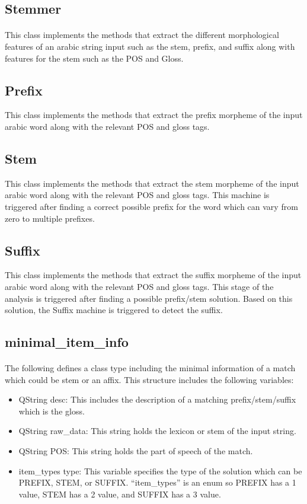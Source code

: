 \documentclass{article}
\begin{document}
\subsection{Stemmer}
\paragraph{}
This class implements the methods that extract the different morphological features of an arabic string input such as the stem, prefix, and suffix along with features for the stem such as the POS and Gloss.

\subsection{Prefix}
This class implements the methods that extract the prefix morpheme of the input arabic word along with the relevant POS and gloss tags.


\subsection{Stem}
This class implements the methods that extract the stem morpheme of the input arabic word along with the relevant POS and gloss tags. This machine is triggered after finding a correct possible prefix for the word which can vary from zero to multiple prefixes.

\subsection{Suffix}
This class implements the methods that extract the suffix morpheme of the input arabic word along with the relevant POS and gloss tags. This stage of the analysis is triggered after finding a possible prefix/stem solution. Based on this solution, the Suffix machine is triggered to detect the suffix.

\subsection{minimal\_item\_info}
\paragraph{}
The following defines a class type including the minimal information of a match which could be stem or an affix. This structure includes the following variables:
\begin{itemize}
\item QString desc: This includes the description of a matching prefix/stem/suffix which is the gloss.
\item QString raw\_data: This string holds the lexicon or stem of the input string.
\item QString POS: This string holds the part of speech of the match.
\item item\_types type: This variable specifies the type of the solution which can be PREFIX, STEM, or SUFFIX. ``item\_types'' is an enum so PREFIX has a 1 value, STEM has a 2 value, and SUFFIX has a 3 value.
\end{itemize}
\end{document}
